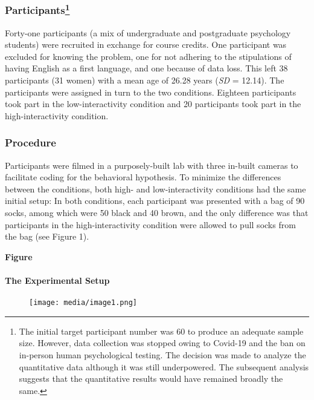 \documentclass{article}
\begin{document}
\subsubsection{Participants\footnote{The initial target participant number was 60 to produce an adequate sample size. However, data collection was stopped owing to Covid-19 and the ban on in-person human psychological testing. The decision was made to analyze the quantitative data although it was still underpowered. The subsequent analysis suggests that the quantitative results would have remained broadly the same. }}

Forty-one participants (a mix of undergraduate and postgraduate psychology students) were recruited in exchange for course credits. One participant was excluded for knowing the problem, one for not adhering to the stipulations of having English as a first language, and one because of data loss. This left 38 participants (31 women) with a mean age of 26.28 years (\emph{SD} = 12.14). The participants were assigned in turn to the two conditions. Eighteen participants took part in the low-interactivity condition and 20 participants took part in the high-interactivity condition. 

\subsubsection{Procedure}

Participants were filmed in a purposely-built lab with three in-built cameras to facilitate coding for the behavioral hypothesis. To minimize the differences between the conditions, both high- and low-interactivity conditions had the same initial setup: In both conditions, each participant was presented with a bag of 90 socks, among which were 50 black and 40 brown, and the only difference was that participants in the high-interactivity condition were allowed to pull socks from the bag (see Figure 1). 

\textbf{Figure }

\paragraph{The Experimental Setup }


\begin{figure}

  \texttt{[image: media/image1.png]}
\caption{}
\label{}


\end{figure}
\end{document}
